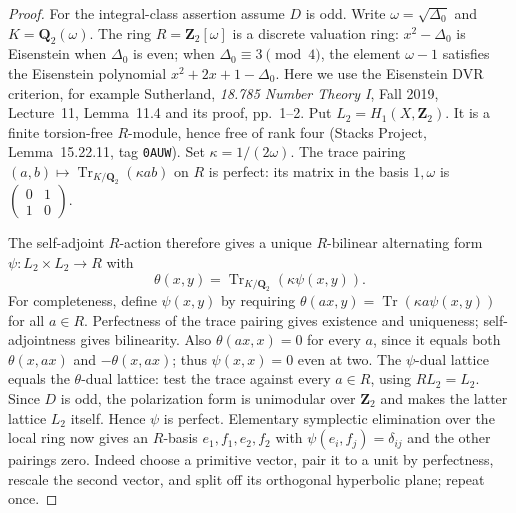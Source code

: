 \begin{proof}
For the integral-class assertion assume $D$ is odd.
Write $\omega=\sqrt{\Delta_0}$ and $K=\mathbf Q_2(\omega)$.
The ring $R=\mathbf Z_2[\omega]$ is a discrete valuation
ring: $x^2-\Delta_0$ is Eisenstein when $\Delta_0$ is even;
when $\Delta_0\equiv3\pmod4$, the element $\omega-1$
satisfies the Eisenstein polynomial
$x^2+2x+1-\Delta_0$.
Here we use the Eisenstein DVR criterion, for example
Sutherland, \emph{18.785 Number Theory I}, Fall 2019,
Lecture~11, Lemma~11.4 and its proof, pp.~1--2.
Put $L_2=H_1(X,\mathbf Z_2)$.
It is a finite torsion-free $R$-module, hence free of
rank four (Stacks Project, Lemma~15.22.11,
tag \texttt{0AUW}).
Set $\kappa=1/(2\omega)$.
The trace pairing $(a,b)\mapsto\operatorname{Tr}_{K/\mathbf Q_2}
(\kappa ab)$ on $R$ is perfect: its matrix in the basis
$1,\omega$ is
$\left(\begin{smallmatrix}0&1\\1&0\end{smallmatrix}\right)$.

The self-adjoint $R$-action therefore gives a unique
$R$-bilinear alternating form $\psi:L_2\times L_2\to R$
with
\[
 \theta(x,y)=\operatorname{Tr}_{K/\mathbf Q_2}
                         (\kappa\psi(x,y)).
 \tag{S32.2}
\]
For completeness, define $\psi(x,y)$ by requiring
$\theta(ax,y)=\operatorname{Tr}(\kappa a\psi(x,y))$
for all $a\in R$. Perfectness of the trace pairing gives
existence and uniqueness; self-adjointness gives
bilinearity. Also $\theta(ax,x)=0$ for every $a$, since
it equals both $\theta(x,ax)$ and $-\theta(x,ax)$;
thus $\psi(x,x)=0$ even at two.
The $\psi$-dual lattice equals the $\theta$-dual lattice:
test the trace against every $a\in R$, using $RL_2=L_2$.
Since $D$ is odd, the polarization form is unimodular
over $\mathbf Z_2$ and makes the latter lattice
$L_2$ itself. Hence $\psi$ is perfect.
Elementary symplectic elimination over the local ring
now gives an $R$-basis $e_1,f_1,e_2,f_2$ with
$\psi(e_i,f_j)=\delta_{ij}$ and the other pairings zero.
Indeed choose a primitive vector, pair it to a unit by
perfectness, rescale the second vector, and split off
its orthogonal hyperbolic plane; repeat once.


\end{proof}
